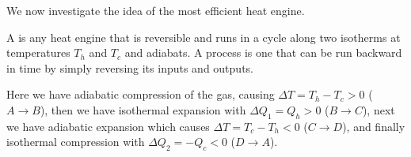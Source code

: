 \documentclass[12pt, a4paper, oneside, openright, titlepage]{book}
\begin{document}
We now investigate the idea of the most efficient heat engine. 

\begin{defn}
    A  is any heat engine that is reversible and runs in a cycle along two isotherms at temperatures $T_h$ and $T_c$ and adiabats. A  process is one that can be run backward in time by simply reversing its inputs and outputs. 
\end{defn}

\begin{eg}
    Here we have adiabatic compression of the gas, causing $\Delta T = T_h - T_c > 0$ ($A\rightarrow B$), then we have isothermal expansion with $\Delta Q_1 = Q_h > 0$ ($B\rightarrow C$), next we have adiabatic expansion which causes $\Delta T = T_c - T_h < 0$ ($C\rightarrow D$), and finally isothermal compression with $\Delta Q_2 = -Q_c < 0$ ($D\rightarrow A$).
    \begin{center}
        \begin{tikzpicture}[x=0.75pt,y=0.75pt,yscale=-1,xscale=1]


\end{tikzpicture}
\end{center}
\end{eg}
\end{document}
